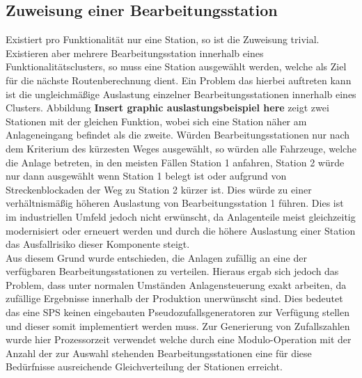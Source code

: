 		
		\subsection{Zuweisung einer Bearbeitungsstation}
			\label{Zuweisung_Station}
			Existiert pro Funktionalität nur eine Station, so ist die Zuweisung trivial. Existieren aber mehrere Bearbeitungsstation innerhalb eines Funktionalitätsclusters, so muss eine Station ausgewählt werden, welche als Ziel für die nächste Routenberechnung dient. Ein Problem das hierbei auftreten kann ist die ungleichmäßige Auslastung einzelner Bearbeitungsstationen innerhalb eines Clusters. Abbildung \textbf{Insert graphic auslastungsbeispiel here} zeigt zwei Stationen mit der gleichen Funktion, wobei sich eine Station näher am Anlageneingang befindet als die zweite. Würden Bearbeitungsstationen nur nach dem Kriterium des kürzesten Weges ausgewählt, so würden alle Fahrzeuge, welche die Anlage betreten, in den meisten Fällen Station 1 anfahren, Station 2 würde nur dann ausgewählt wenn Station 1 belegt ist oder aufgrund von Streckenblockaden der Weg zu Station 2 kürzer ist. Dies würde zu einer verhältnismäßig höheren Auslastung von Bearbeitungsstation 1 führen. Dies ist im industriellen Umfeld jedoch nicht erwünscht, da Anlagenteile meist gleichzeitig modernisiert oder erneuert werden und durch die höhere Auslastung einer Station das Ausfallrisiko dieser Komponente steigt.\\
			
			Aus diesem Grund wurde entschieden, die Anlagen zufällig an eine der verfügbaren Bearbeitungsstationen zu verteilen. Hieraus ergab sich jedoch das Problem, dass unter normalen Umständen Anlagensteuerung exakt arbeiten, da zufällige Ergebnisse innerhalb der Produktion unerwünscht sind. Dies bedeutet das eine \ac{SPS} keinen eingebauten Pseudozufallsgeneratoren zur Verfügung stellen und dieser somit implementiert werden muss. Zur Generierung von Zufallszahlen wurde hier Prozessorzeit verwendet welche durch eine Modulo-Operation mit der Anzahl der zur Auswahl stehenden Bearbeitungsstationen eine für diese Bedürfnisse ausreichende Gleichverteilung der Stationen erreicht.
		
